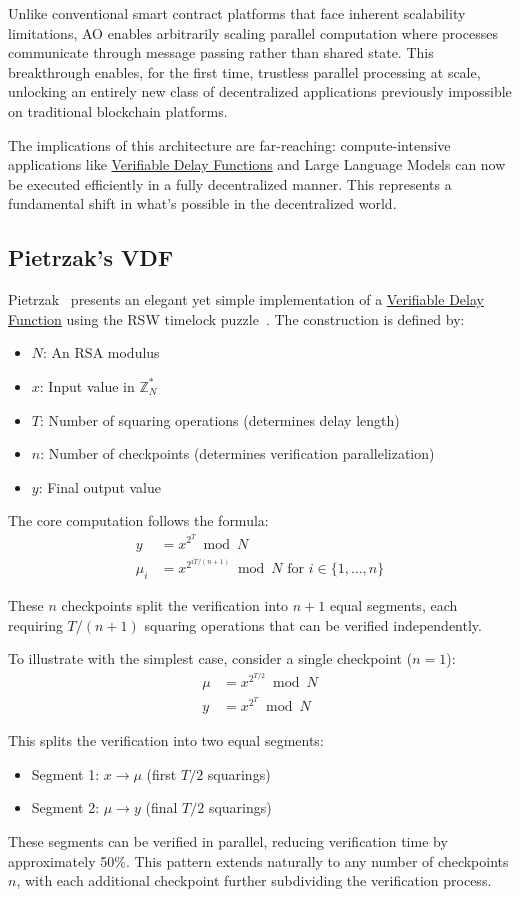 Unlike conventional smart contract platforms that face inherent scalability limitations, AO enables arbitrarily scaling parallel computation where processes communicate through message passing rather than shared state. This breakthrough enables, for the first time, trustless parallel processing at scale, unlocking an entirely new class of decentralized applications previously impossible on traditional blockchain platforms.

The implications of this architecture are far-reaching: compute-intensive applications like \hyperref[sec:vdf]{Verifiable Delay Functions} and Large Language Models can now be executed efficiently in a fully decentralized manner. This represents a fundamental shift in what's possible in the decentralized world.
\subsection{Pietrzak's VDF}\label{sec:pietrzak}
Pietrzak~\cite{pietrzak:LIPIcs.ITCS.2019.60} presents an elegant yet simple implementation of a \hyperref[sec:vdf]{Verifiable Delay Function} using the RSW timelock puzzle~\cite{rivest1996timelock}. The construction is defined by:

\begin{itemize}
    \item $N$: An RSA modulus
    \item $x$: Input value in $\mathbb{Z}_N^*$
    \item $T$: Number of squaring operations (determines delay length)
    \item $n$: Number of checkpoints (determines verification parallelization)
    \item $y$: Final output value
\end{itemize}

The core computation follows the formula:
\begin{align*}
    y &= x^{2^T} \bmod N \\
    \mu_i &= x^{2^{iT/(n+1)}} \bmod N \text{ for } i \in \{1,\ldots,n\}
\end{align*}

These $n$ checkpoints split the verification into $n+1$ equal segments, each requiring $T/(n+1)$ squaring operations that can be verified independently.

To illustrate with the simplest case, consider a single checkpoint ($n=1$):
\begin{align*}
    \mu &= x^{2^{T/2}} \bmod N \\
    y &= x^{2^T} \bmod N
\end{align*}

This splits the verification into two equal segments:
\begin{itemize}
    \item Segment 1: $x \rightarrow \mu$ (first $T/2$ squarings)
    \item Segment 2: $\mu \rightarrow y$ (final $T/2$ squarings)
\end{itemize}

These segments can be verified in parallel, reducing verification time by approximately 50\%. This pattern extends naturally to any number of checkpoints $n$, with each additional checkpoint further subdividing the verification process.
